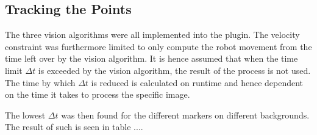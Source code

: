 \subsection{Tracking the Points}
The three vision algorithms were all implemented into the plugin.
The velocity constraint was furthermore limited to only compute the robot movement from the time left over by the vision algorithm.
It is hence assumed that when the time limit $\Delta t$ is exceeded by the vision algorithm, the result of the process is not used.
The time by which $\Delta t$ is reduced is calculated on runtime and hence dependent on the time it takes to process the specific image.

The lowest $\Delta t$ was then found for the different markers on different backgrounds.
The result of such is seen in table ....


\begin{table}
\begin{tabular}{|c|c|c|c|}

\end{tabular}
\end{table}



